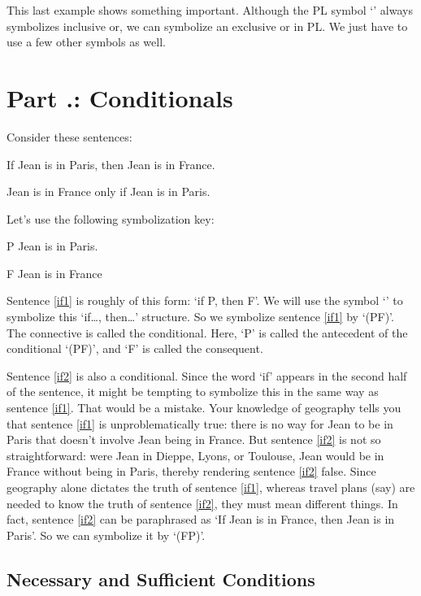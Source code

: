 This last example shows something important. Although the PL symbol ‘\eor’ always symbolizes inclusive or, we can symbolize an exclusive or in PL. We just have to use a few other symbols as well.
\section{Part \thechapcount.\theseccount: Conditionals} 
Consider these sentences:
	\begin{earg}
		\item[\ex{if1}] If Jean is in Paris, then Jean is in France.
		\item[\ex{if2}] Jean is in France only if Jean is in Paris.
	\end{earg}
Let's use the following symbolization key:
	\begin{ekey}
		\item[P] Jean is in Paris.
		\item[F] Jean is in France
	\end{ekey}
Sentence \ref{if1} is roughly of this form: ‘if P, then F’. We will use the symbol ‘\eif’ to symbolize this ‘if\ldots, then\ldots’ structure. So we symbolize sentence \ref{if1} by ‘(P\eif F)’. The connective is called the \gls{conditional}. Here, ‘P’ is called the \gls{antecedent} of the conditional ‘(P\eif F)’, and ‘F’ is called the \gls{consequent}.

Sentence \ref{if2} is also a conditional. Since the word ‘if’ appears in the second half of the sentence, it might be tempting to symbolize this in the same way as sentence \ref{if1}. That would be a mistake. Your knowledge of geography tells you that sentence \ref{if1} is unproblematically true: there is no way for Jean to be in Paris that doesn’t involve Jean being in France. But sentence \ref{if2} is not so straightforward: were Jean in Dieppe, Lyons, or Toulouse, Jean would be in France without being in Paris, thereby rendering sentence \ref{if2} false. Since geography alone dictates the truth of sentence \ref{if1}, whereas travel plans (say) are needed to know the truth of sentence \ref{if2}, they must mean different things.
In fact, sentence \ref{if2} can be paraphrased as ‘If Jean is in France, then Jean is in Paris’. So we can symbolize it by ‘(F\eif P)’.


\subsection{Necessary and Sufficient Conditions}

